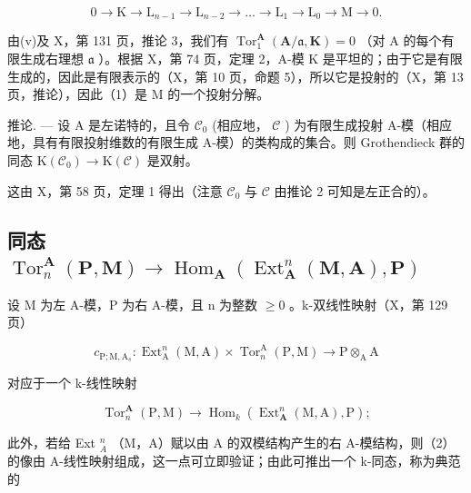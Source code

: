 \[
0 \rightarrow \mathrm{K} \rightarrow \mathrm{L} _ {n - 1} \rightarrow \mathrm{L} _ {n - 2} \rightarrow \dots \rightarrow \mathrm{L} _ {1} \rightarrow \mathrm{L} _ {0} \rightarrow \mathrm{M} \rightarrow 0.\tag{1}
\]

由(v)及 X，第 131 页，推论 3，我们有 \(\operatorname{Tor}_{1}^{\mathbf{A}}(\mathbf{A}/\mathfrak{a},\mathbf{K}) = 0\) （对 A 的每个有限生成右理想 \(\mathfrak{a}\) ）。根据 X，第 74 页，定理 2，A-模 K 是平坦的；由于它是有限生成的，因此是有限表示的（X，第 10 页，命题 5），所以它是投射的（X，第 13 页，推论），因此（1）是 M 的一个投射分解。

推论. --- 设 A 是左诺特的，且令 \(\mathcal{C}_{0}\) (相应地， \(\mathcal{C}\) ) 为有限生成投射 A-模（相应地，具有有限投射维数的有限生成 A-模）的类构成的集合。则 Grothendieck 群的同态 \(\mathrm{K}(\mathcal{C}_{0}) \to \mathrm{K}(\mathcal{C})\) 是双射。

这由 X，第 58 页，定理 1 得出（注意 \(\mathcal{C}_0\) 与 \(\mathcal{C}\) 由推论 2 可知是左正合的）。

\subsection{\texorpdfstring{同态 \(\operatorname{Tor}_n^{\mathbf{A}}(\mathbf{P},\mathbf{M})\to \operatorname{Hom}_{\mathbf{A}}(\operatorname{Ext}_{\mathbf{A}}^{n}(\mathbf{M},\mathbf{A}),\mathbf{P})\)}{同态 \textbackslash operatorname\{Tor\}\_n\^{}\{\textbackslash mathbf\{A\}\}(\textbackslash mathbf\{P\},\textbackslash mathbf\{M\})\textbackslash 到 \textbackslash operatorname\{Hom\}\_\{\textbackslash mathbf\{A\}\}(\textbackslash operatorname\{Ext\}\_\{\textbackslash mathbf\{A\}\}\^{}\{n\}(\textbackslash mathbf\{M\},\textbackslash mathbf\{A\}),\textbackslash mathbf\{P\})}}

设 M 为左 A-模，P 为右 A-模，且 n 为整数 \(\geqslant 0\) 。k-双线性映射（X，第 129 页）

\[
c _ {\mathrm{P}; \mathrm{M}, \mathrm{A} _ {s}}: \operatorname{Ext} _ {\mathrm{A}} ^ {n} (\mathrm{M}, \mathrm{A}) \times \operatorname{Tor} _ {n} ^ {\mathrm{A}} (\mathrm{P}, \mathrm{M}) \rightarrow \mathrm{P} \otimes_ {\mathrm{A}} \mathrm{A}
\]

对应于一个 k-线性映射

\[
\operatorname{Tor} _ {n} ^ {\mathbf {A}} (\mathrm{P}, \mathrm{M}) \rightarrow \operatorname{Hom} _ {k} \left(\operatorname{Ext} _ {\mathbf {A}} ^ {n} (\mathrm{M}, \mathrm{A}), \mathrm{P}\right);\tag{2}
\]

此外，若给 Ext \(_{A}^{n}\) （M，A）赋以由 A 的双模结构产生的右 A-模结构，则（2）的像由 A-线性映射组成，这一点可立即验证；由此可推出一个 k-同态，称为典范的

